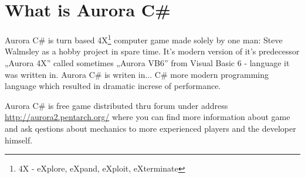 \documentclass[../../Aurora C# unofficial manual.tex]{subfiles}
\begin{document}
	\section{What is Aurora C\#}
	Aurora C\# is turn based 4X\footnote{4X - eXplore, eXpand, eXploit, eXterminate}
	computer game made solely by one man: Steve Walmsley as a hobby project in spare time.
	It's modern version of it's predecessor „Aurora 4X” called sometimes „Aurora VB6” from
	Visual Basic 6 - language it was written in. Aurora C\# is writen in... C\# more modern
	programming language which resulted in dramatic increse of performance.
	
	Aurora C\# is free game distributed thru forum under address
	\href{http://aurora2.pentarch.org/}{http://aurora2.pentarch.org/} where you can find
	more information about game and ask qestions about mechanics to more experienced
	players and the developer himself.
\end{document}
